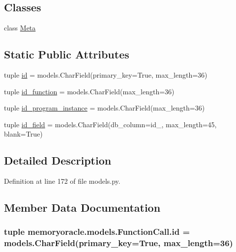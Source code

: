 \subsection*{Classes}
\begin{DoxyCompactItemize}
\item 
class \hyperlink{classmemoryoracle_1_1models_1_1FunctionCall_1_1Meta}{Meta}
\end{DoxyCompactItemize}
\subsection*{Static Public Attributes}
\begin{DoxyCompactItemize}
\item 
tuple \hyperlink{classmemoryoracle_1_1models_1_1FunctionCall_a6b959e70485e5f87caf92203a45ae161}{id} = models.\+Char\+Field(primary\+\_\+key=True, max\+\_\+length=36)
\item 
tuple \hyperlink{classmemoryoracle_1_1models_1_1FunctionCall_a6c2f0c5abdeaed19f1ceea33dbe1f5ea}{id\+\_\+function} = models.\+Char\+Field(max\+\_\+length=36)
\item 
tuple \hyperlink{classmemoryoracle_1_1models_1_1FunctionCall_ab9399836b9c41f224159af0f9c862380}{id\+\_\+program\+\_\+instance} = models.\+Char\+Field(max\+\_\+length=36)
\item 
tuple \hyperlink{classmemoryoracle_1_1models_1_1FunctionCall_a88f5f9c5017592289b962bc357b6436b}{id\+\_\+field} = models.\+Char\+Field(db\+\_\+column=\textquotesingle{}id\+\_\+\textquotesingle{}, max\+\_\+length=45, blank=True)
\end{DoxyCompactItemize}


\subsection{Detailed Description}


Definition at line 172 of file models.\+py.



\subsection{Member Data Documentation}
\hypertarget{classmemoryoracle_1_1models_1_1FunctionCall_a6b959e70485e5f87caf92203a45ae161}{}
\subsubsection[{id}]{\setlength{\rightskip}{0pt plus 5cm}tuple memoryoracle.\+models.\+Function\+Call.\+id = models.\+Char\+Field(primary\+\_\+key=True, max\+\_\+length=36)\hspace{0.3cm}{\ttfamily [static]}}\label{classmemoryoracle_1_1models_1_1FunctionCall_a6b959e70485e5f87caf92203a45ae161}


